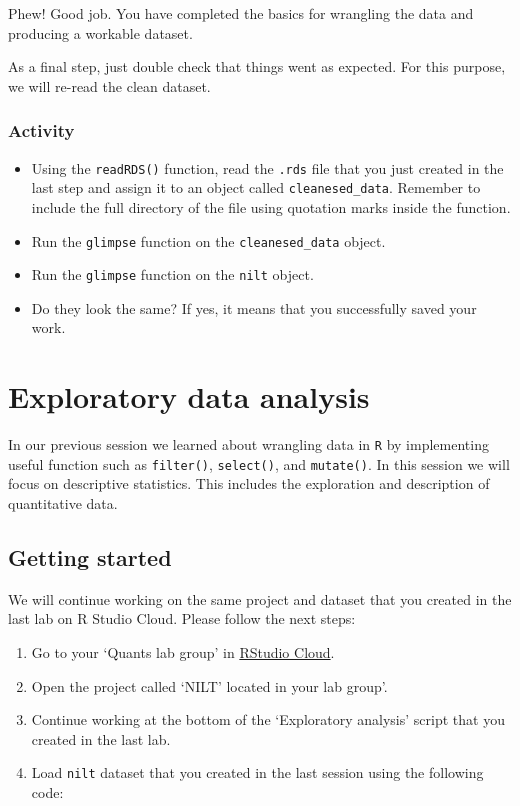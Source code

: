 \documentclass[
]{book}
\providecommand{\tightlist}{%
  \setlength{\itemsep}{0pt}\setlength{\parskip}{0pt}}
\begin{document}
Phew! Good job. You have completed the basics for wrangling the data and producing a workable dataset.

As a final step, just double check that things went as expected. For this purpose, we will re-read the clean dataset.

\hypertarget{activity-4}{%
\subsection{Activity}\label{activity-4}}

\begin{itemize}
\tightlist
\item
  Using the \texttt{readRDS()} function, read the \texttt{.rds} file that you just created in the last step and assign it to an object called \texttt{cleanesed\_data}. Remember to include the full directory of the file using quotation marks inside the function.
\item
  Run the \texttt{glimpse} function on the \texttt{cleanesed\_data} object.
\item
  Run the \texttt{glimpse} function on the \texttt{nilt} object.
\item
  Do they look the same? If yes, it means that you successfully saved your work.
\end{itemize}

\hypertarget{exploratory-data-analysis}{%
\chapter{Exploratory data analysis}\label{exploratory-data-analysis}}

In our previous session we learned about wrangling data in \texttt{R} by implementing useful function such as \texttt{filter()}, \texttt{select()}, and \texttt{mutate()}. In this session we will focus on descriptive statistics. This includes the exploration and description of quantitative data.

\hypertarget{getting-started-1}{%
\section{Getting started}\label{getting-started-1}}

We will continue working on the same project and dataset that you created in the last lab on R Studio Cloud. Please follow the next steps:

\begin{enumerate}
\def\labelenumi{\arabic{enumi}.}
\tightlist
\item
  Go to your `Quants lab group' in \href{https://rstudio.cloud/}{RStudio Cloud}.
\item
  Open the project called `NILT' located in your lab group'.
\item
  Continue working at the bottom of the `Exploratory analysis' script that you created in the last lab.
\item
  Load \texttt{nilt} dataset that you created in the last session using the following code:
\end{enumerate}
\end{document}
